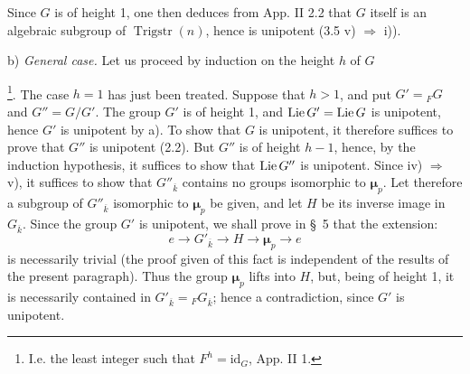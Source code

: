 Since $G$ is of height 1, one then deduces from App. II 2.2 that $G$ itself is an algebraic subgroup of $\operatorname{Trigstr}(n)$, hence is unipotent (3.5 v) $\Rightarrow$ i)).

\noindent b) \emph{General case.} Let us proceed by induction on the height $h$ of $G$\begingroup\renewcommand{\thefootnote}{*}\addtocounter{footnote}{-1}\footnote{I.e. the least integer such that $F^h=\mathrm{id}_G$, \cf App. II 1.}\endgroup.
The case $h=1$ has just been treated. Suppose that $h>1$, and put $G'={}_F G$ and $G''=G/G'$. The group $G'$ is of height 1, and $\operatorname{Lie} G'=\operatorname{Lie} G$ is unipotent, hence $G'$ is unipotent by a). To show that $G$ is unipotent, it therefore suffices to prove that $G''$ is unipotent (2.2). But $G''$ is of height $h-1$, hence, by the induction hypothesis, it suffices to show that $\operatorname{Lie} G''$ is unipotent. Since iv) $\Rightarrow$ v), it suffices to show that $G''_{\overline k}$ contains no groups isomorphic to $\boldsymbol\mu_p$. Let therefore a subgroup of $G''_{\overline k}$ isomorphic to $\boldsymbol\mu_p$ be given, and let $H$ be its inverse image in $G_{\overline k}$. Since the group $G'$ is unipotent, we shall prove in \S~5 that the extension:
\[
 e\to G'_{\overline k}\to H\to\boldsymbol\mu_p\to e
\]
is necessarily trivial (the proof given of this fact is independent of the results of the present paragraph). Thus the group $\boldsymbol\mu_p$ lifts into $H$, but, being of height 1, it is necessarily contained in $G'_{\overline k}={}_F G_{\overline k}$; hence a contradiction, since $G'$ is unipotent.

